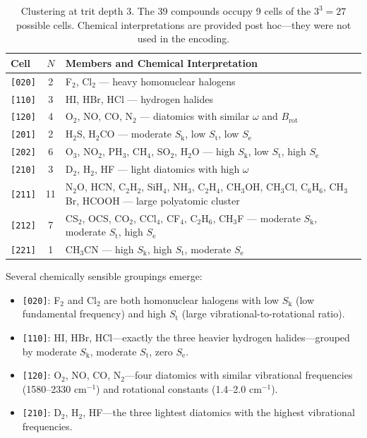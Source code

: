 \documentclass[11pt,a4paper]{article}
\theoremstyle{definition}
\theoremstyle{remark}
\newcommand{\Sk}{S_{\mathrm{k}}}
\newcommand{\St}{S_{\mathrm{t}}}
\newcommand{\Se}{S_{\mathrm{e}}}
\newcommand{\Brot}{B_{\mathrm{rot}}}
\begin{document}
\begin{table}[H]
\centering
\caption{Clustering at trit depth 3. The 39 compounds occupy 9 cells of the $3^3 = 27$ possible cells. Chemical interpretations are provided post hoc---they were not used in the encoding.}
\label{tab:depth3}
\begin{tabular}{lcp{8.5cm}}
\toprule
Cell & $N$ & Members and Chemical Interpretation \\
\midrule
\texttt{[020]} & 2 & F$_2$, Cl$_2$ --- heavy homonuclear halogens \\
\texttt{[110]} & 3 & HI, HBr, HCl --- hydrogen halides \\
\texttt{[120]} & 4 & O$_2$, NO, CO, N$_2$ --- diatomics with similar $\omega$ and $\Brot$ \\
\texttt{[201]} & 2 & H$_2$S, H$_2$CO --- moderate $\Sk$, low $\St$, low $\Se$ \\
\texttt{[202]} & 6 & O$_3$, NO$_2$, PH$_3$, CH$_4$, SO$_2$, H$_2$O --- high $\Sk$, low $\St$, high $\Se$ \\
\texttt{[210]} & 3 & D$_2$, H$_2$, HF --- light diatomics with high $\omega$ \\
\texttt{[211]} & 11 & N$_2$O, HCN, C$_2$H$_2$, SiH$_4$, NH$_3$, C$_2$H$_4$, CH$_3$OH, CH$_3$Cl, C$_6$H$_6$, CH$_3$Br, HCOOH --- large polyatomic cluster \\
\texttt{[212]} & 7 & CS$_2$, OCS, CO$_2$, CCl$_4$, CF$_4$, C$_2$H$_6$, CH$_3$F --- moderate $\Sk$, moderate $\St$, high $\Se$ \\
\texttt{[221]} & 1 & CH$_3$CN --- high $\Sk$, high $\St$, moderate $\Se$ \\
\bottomrule
\end{tabular}
\end{table}

Several chemically sensible groupings emerge:

\begin{itemize}[nosep]
\item \texttt{[020]}: F$_2$ and Cl$_2$ are both homonuclear halogens with low $\Sk$ (low fundamental frequency) and high $\St$ (large vibrational-to-rotational ratio).
\item \texttt{[110]}: HI, HBr, HCl---exactly the three heavier hydrogen halides---grouped by moderate $\Sk$, moderate $\St$, zero $\Se$.
\item \texttt{[120]}: O$_2$, NO, CO, N$_2$---four diatomics with similar vibrational frequencies (1580--2330 cm$^{-1}$) and rotational constants (1.4--2.0 cm$^{-1}$).
\item \texttt{[210]}: D$_2$, H$_2$, HF---the three lightest diatomics with the highest vibrational frequencies.
\end{itemize}
\end{document}
